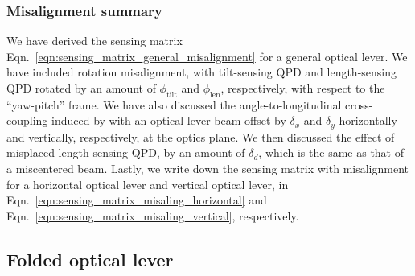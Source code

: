 \subsubsection{Misalignment summary}
We have derived the sensing matrix Eqn.~\eqref{eqn:sensing_matrix_general_misalignment} for a general optical lever.
We have included rotation misalignment, with tilt-sensing QPD and length-sensing QPD rotated by an amount of $\phi_\mathrm{tilt}$ and $\phi_\mathrm{len}$, respectively, with respect to the ``yaw-pitch'' frame.
We have also discussed the angle-to-longitudinal cross-coupling induced by with an optical lever beam offset by $\delta_x$ and $\delta_y$ horizontally and vertically, respectively, at the optics plane.
We then discussed the effect of misplaced length-sensing QPD, by an amount of $\delta_d$, which is the same as that of a miscentered beam.
Lastly, we write down the sensing matrix with misalignment for a horizontal optical lever and vertical optical lever, in Eqn.~\eqref{eqn:sensing_matrix_misaling_horizontal} and Eqn.~\eqref{eqn:sensing_matrix_misaling_vertical}, respectively.


\subsection{Folded optical lever}





